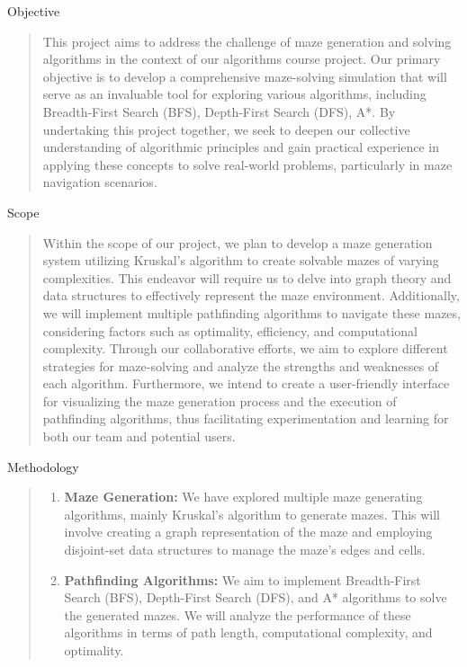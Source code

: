 \documentclass{amsart}
\begin{document}
\begin{section}{Objective}
    \begin{quote}
        This project aims to address the challenge of maze generation and solving algorithms in the context of our algorithms course project. Our primary objective is to develop a comprehensive maze-solving simulation that will serve as an invaluable tool for exploring various algorithms, including Breadth-First Search (BFS), Depth-First Search (DFS), A*. By undertaking this project together, we seek to deepen our collective understanding of algorithmic principles and gain practical experience in applying these concepts to solve real-world problems, particularly in maze navigation scenarios.
    \end{quote}
\end{section}

\begin{section}{Scope}
    \begin{quote}
        Within the scope of our project, we plan to develop a maze generation system utilizing Kruskal's algorithm to create solvable mazes of varying complexities. This endeavor will require us to delve into graph theory and data structures to effectively represent the maze environment. Additionally, we will implement multiple pathfinding algorithms to navigate these mazes, considering factors such as optimality, efficiency, and computational complexity. Through our collaborative efforts, we aim to explore different strategies for maze-solving and analyze the strengths and weaknesses of each algorithm. Furthermore, we intend to create a user-friendly interface for visualizing the maze generation process and the execution of pathfinding algorithms, thus facilitating experimentation and learning for both our team and potential users.
    \end{quote}
\end{section}

\begin{section}{Methodology}
    \begin{quote}
        \begin{enumerate}
            \item \textbf{Maze Generation:} We have explored multiple maze generating algorithms, mainly Kruskal's algorithm to generate mazes. This will involve creating a graph representation of the maze and employing disjoint-set data structures to manage the maze's edges and cells. 
            \item \textbf{Pathfinding Algorithms:} We aim to implement Breadth-First Search (BFS), Depth-First Search (DFS), and A* algorithms to solve the generated mazes. We will analyze the performance of these algorithms in terms of path length, computational complexity, and optimality.
        \end{enumerate}
    \end{quote}
\end{section}
\end{document}
